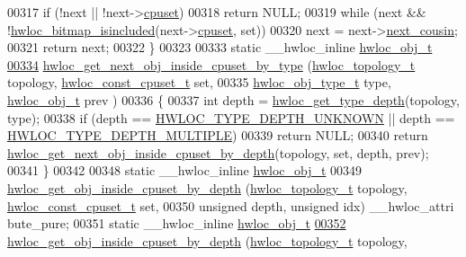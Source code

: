 \begin{DoxyCode}
00317   \textcolor{keywordflow}{if} (!next || !next->\hyperlink{a00016_a67925e0f2c47f50408fbdb9bddd0790f}{cpuset})
00318     \textcolor{keywordflow}{return} NULL;
00319   \textcolor{keywordflow}{while} (next && !\hyperlink{a00065_gaae29e14a926c198e8f91e6e4790621e7}{hwloc_bitmap_isincluded}(next->\hyperlink{a00016_a67925e0f2c47f50408fbdb9bddd0790f}{cpuset}, \textcolor{keyword}{set}))
00320     next = next->\hyperlink{a00016_a85a788017457129589318b6c39451acf}{next_cousin};
00321   \textcolor{keywordflow}{return} next;
00322 \}
00323 
00333 \textcolor{keyword}{static} \_\_hwloc\_inline \hyperlink{a00016}{hwloc_obj_t}
\hypertarget{a00031_source_l00334}{}\hyperlink{a00054_ga934e7ecd68b33403e0c0be779d9ed1e6}{00334} \hyperlink{a00054_ga934e7ecd68b33403e0c0be779d9ed1e6}{hwloc_get_next_obj_inside_cpuset_by_type} (\hyperlink{a00039_ga9d1e76ee15a7dee158b786c30b6a6e38}{hwloc_topology_t} topology, 
      \hyperlink{a00040_ga1f784433e9b606261f62d1134f6a3b25}{hwloc_const_cpuset_t} \textcolor{keyword}{set},
00335                                           \hyperlink{a00041_gacd37bb612667dc437d66bfb175a8dc55}{hwloc_obj_type_t} type, \hyperlink{a00016}{hwloc_obj_t} prev
      )
00336 \{
00337   \textcolor{keywordtype}{int} depth = \hyperlink{a00046_gaea7c64dd59467f5201ba87712710b14d}{hwloc_get_type_depth}(topology, type);
00338   \textcolor{keywordflow}{if} (depth == \hyperlink{a00046_ggaf4e663cf42bbe20756b849c6293ef575a0565ab92ab72cb0cec91e23003294aad}{HWLOC_TYPE_DEPTH_UNKNOWN} || depth == \hyperlink{a00046_ggaf4e663cf42bbe20756b849c6293ef575ae99465995cacde6c210d5fc2e409798c}{HWLOC_TYPE_DEPTH_MULTIPLE})
00339     \textcolor{keywordflow}{return} NULL;
00340   \textcolor{keywordflow}{return} \hyperlink{a00054_ga8af256c2572f16520f95440b884c1bd6}{hwloc_get_next_obj_inside_cpuset_by_depth}(topology, \textcolor{keyword}{set}, depth, prev);
00341 \}
00342 
00348 \textcolor{keyword}{static} \_\_hwloc\_inline \hyperlink{a00016}{hwloc_obj_t}
00349 \hyperlink{a00054_ga57c8a0e227d1b16a31d19aaf755b42c0}{hwloc_get_obj_inside_cpuset_by_depth} (\hyperlink{a00039_ga9d1e76ee15a7dee158b786c30b6a6e38}{hwloc_topology_t} topology, 
      \hyperlink{a00040_ga1f784433e9b606261f62d1134f6a3b25}{hwloc_const_cpuset_t} \textcolor{keyword}{set},
00350                                       \textcolor{keywordtype}{unsigned} depth, \textcolor{keywordtype}{unsigned} idx) \_\_hwloc\_attri
      bute\_pure;
00351 \textcolor{keyword}{static} \_\_hwloc\_inline \hyperlink{a00016}{hwloc_obj_t}
\hypertarget{a00031_source_l00352}{}\hyperlink{a00054_ga57c8a0e227d1b16a31d19aaf755b42c0}{00352} \hyperlink{a00054_ga57c8a0e227d1b16a31d19aaf755b42c0}{hwloc_get_obj_inside_cpuset_by_depth} (\hyperlink{a00039_ga9d1e76ee15a7dee158b786c30b6a6e38}{hwloc_topology_t} topology, 

\end{DoxyCode}
